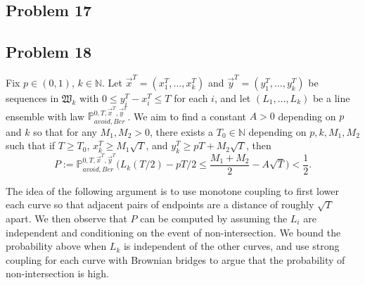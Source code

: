 \documentclass[12pt]{article}
\begin{document}
\subsection*{Problem 17}


\subsection*{Problem 18}

	Fix $p\in(0,1)$, $k\in\mathbb{N}$. Let $\vec{x}^T = (x_1^T,\dots,x_k^T)$ and $\vec{y}^T = (y_1^T,\dots,y_k^T)$ be sequences in $\mathfrak{W}_k$ with $0\leq y_i^T - x_i^T \leq T$ for each $i$, and let $(L_1,\dots,L_k)$ be a line ensemble with law $\mathbb{P}^{0,T,\vec{x}^T,\vec{y}^T}_{avoid, Ber}$.  We aim to find a constant $A>0$ depending on $p$ and $k$ so that for any $M_1, M_2 > 0$, there exists a $T_0 \in \mathbb{N}$ depending on $p,k,M_1,M_2$ such that if $T\geq T_0$, $x_k^T \geq M_1\sqrt{T}$, and $y_k^T \geq pT + M_2\sqrt{T}$, then
	\[
	P := \mathbb{P}^{0,T,\vec{x}^T,\vec{y}^T}_{avoid, Ber} \Big( L_k(T/2) - pT/2 \leq \frac{M_1+M_2}{2} - A\sqrt{T} \Big) < \frac{1}{2}.
	\]
	
	The idea of the following argument is to use monotone coupling to first lower each curve so that adjacent pairs of endpoints are a distance of roughly $\sqrt{T}$ apart. We then observe that $P$ can be computed by assuming the $L_i$ are independent and conditioning on the event of non-intersection. We bound the probability above when $L_k$ is independent of the other curves, and use strong coupling for each curve with Brownian bridges to argue that the probability of non-intersection is high.
	
\end{document}

